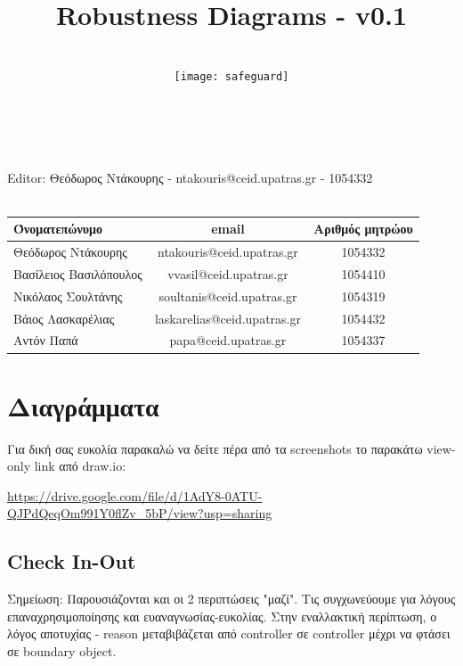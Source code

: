 \documentclass{article}
\title{Robustness Diagrams - v0.1}
\author{\\
\texttt{[image: safeguard]}\\[1ex]\\\\
}
\begin{document}
\maketitle

\newpage

\noident Editor: Θεόδωρος Ντάκουρης - ntakouris@ceid.upatras.gr - 1054332\\
\\

\begin{tabular}{|l|c|c|}
\hline
Όνοματεπώνυμο & email & Αριθμός μητρώου  \\
\hline
Θεόδωρος Ντάκουρης & ntakouris@ceid.upatras.gr & 1054332 \\
Βασίλειος Βασιλόπουλος & vvasil@ceid.upatras.gr &  1054410 \\
Νικόλαος Σουλτάνης & soultanis@ceid.upatras.gr & 1054319  \\
Βάιος Λασκαρέλιας & laskarelias@ceid.upatras.gr & 1054432 \\
Αντόν Παπά & papa@ceid.upatras.gr & 1054337 \\
\hline
\end{tabular}

\renewcommand{\contentsname}{Περιεχόμενα}
\tableofcontents

\section{Διαγράμματα}
Για δική σας ευκολία παρακαλώ να δείτε πέρα από τα screenshots το παρακάτω view-only link από draw.io:

\url{https://drive.google.com/file/d/1AdY8-0ATU-QJPdQeqOm991Y0flZv_5bP/view?usp=sharing}

\subsection{Check In-Out}

\noindent Σημείωση: Παρουσιάζονται και οι 2 περιπτώσεις "μαζί". Τις συγχωνεύουμε για λόγους επαναχρησιμοποίησης και ευαναγνωσίας-ευκολίας. Στην εναλλακτική περίπτωση, ο λόγος αποτυχίας - reason μεταβιβάζεται από controller σε controller μέχρι να φτάσει σε boundary object.
\end{document}
